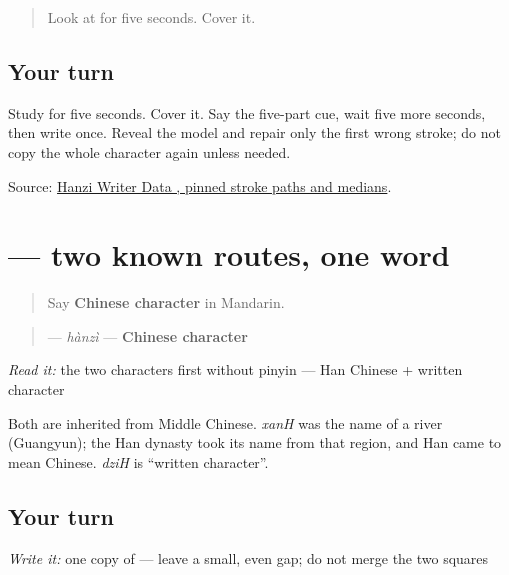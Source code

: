 \begin{quote}
Look at \textbf{} for five seconds. Cover it.
\end{quote}

\subsection*{Your turn}

Study \textbf{} for five seconds. Cover it. Say the five-part cue, wait five more seconds, then write once. Reveal the model and repair only the first wrong stroke; do not copy the whole character again unless needed.

\begin{tcolorbox}[breakable,colback=teal!4,colframe=teal!35!black,title={Before you move on}]
Source: \href{https://raw.githubusercontent.com/chanind/hanzi-writer-data/68d10a4b21150cae5e1ebbd223eed289cf32d90c/data/\%E6\%B1\%89.json}{Hanzi Writer Data , pinned stroke paths and medians}.
\end{tcolorbox}
\section[\texorpdfstring{\zh{汉字} (hànzì)}{汉字 (hànzì)}]{ — two known routes, one word}

\label{lesson:ZH-C16-hanzi}



\begin{quote}
Say \textbf{Chinese character} in Mandarin.
\end{quote}

\begin{cousinweb}
\begin{quote}
\textbf{} — \emph{hànzì} — \textbf{Chinese character}
\end{quote}

\emph{Read it:} the two characters first without pinyin — Han Chinese + written character

Both are inherited from Middle Chinese. \emph{xanH} was the name of a river (Guangyun); the Han dynasty took its name from that region, and Han came to mean Chinese. \emph{dziH} is \textquotedblleft{}written character\textquotedblright{}.
\end{cousinweb}

\subsection*{Your turn}
\emph{Write it:} one copy of \textbf{} — leave a small, even gap; do not merge the two squares


